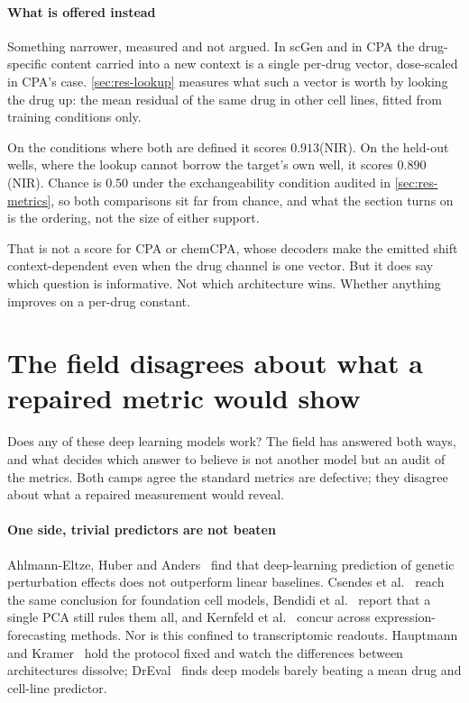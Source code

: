 \paragraph{What is offered instead} Something narrower, measured and not argued.
In scGen and in CPA the drug-specific content carried into a new context is a
single per-drug vector, dose-scaled in CPA's case. \cref{sec:res-lookup}
measures what such a vector is worth by looking the drug up: the mean residual of
the same drug in other cell lines, fitted from training conditions
only.

On the conditions where both are defined it scores $0.913$(NIR). On the held-out wells, where the lookup cannot
borrow the target's own well, it scores $0.890$(NIR). Chance is $0.50$ under the
exchangeability condition audited in \cref{sec:res-metrics}, so both comparisons
sit far from chance, and what the section turns
on is the ordering, not the size of either support.

That is not a score for CPA or chemCPA, whose decoders make the emitted shift
context-dependent even when the drug channel is one vector. But it does say which
question is informative. Not which architecture wins. Whether anything improves
on a per-drug constant.


\section{The field disagrees about what a repaired metric would show}
\label{sec:lit-dispute}
\framedecl{-}

\begin{question}
Does any of these deep learning models work? The field has answered both ways, and what decides which
answer to believe is not another model but an audit of the metrics. Both camps
agree the standard metrics are defective; they disagree about what a repaired
measurement would reveal.
\end{question}

\paragraph{One side, trivial predictors are not beaten}
Ahlmann-Eltze, Huber and Anders~\cite{ahlmanneltze} find that deep-learning
prediction of genetic perturbation effects does not outperform linear baselines.
Csendes et al.~\cite{csendes} reach the same conclusion for foundation cell
models, Bendidi et al.~\cite{bendidi} report that a single PCA still rules them
all, and Kernfeld et al.~\cite{kernfeld} concur across expression-forecasting
methods. Nor is this confined to transcriptomic readouts. Hauptmann and
Kramer~\cite{hauptmann} hold the protocol fixed and watch the differences between
architectures dissolve; DrEval~\cite{dreval} finds deep models barely beating a
mean drug and cell-line predictor.

